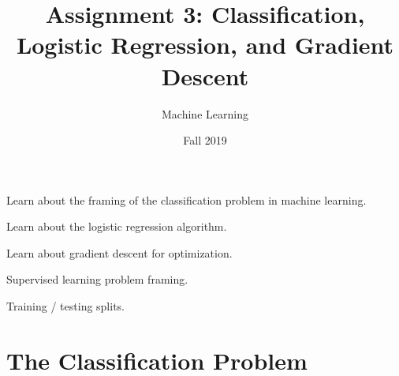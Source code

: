 \documentclass[assignment03_Solutions]{subfiles}
\title{Assignment 3: Classification, Logistic Regression, and Gradient Descent}
\author{Machine Learning}
\date{Fall 2019}
\begin{document}
\maketitle
\thispagestyle{firstpage}


\begin{learningobjectives}
\bi
\item Learn about the framing of the classification problem in machine learning.
\item Learn about the logistic regression algorithm.
\item Learn about gradient descent for optimization.
\ei
\end{learningobjectives}

\begin{priorknowledge}
\bi
\item Supervised learning problem framing.
\item Training / testing splits.
\ei
\end{priorknowledge}
\vspace{1em}

%
%


\section{The Classification Problem}
\end{document}
